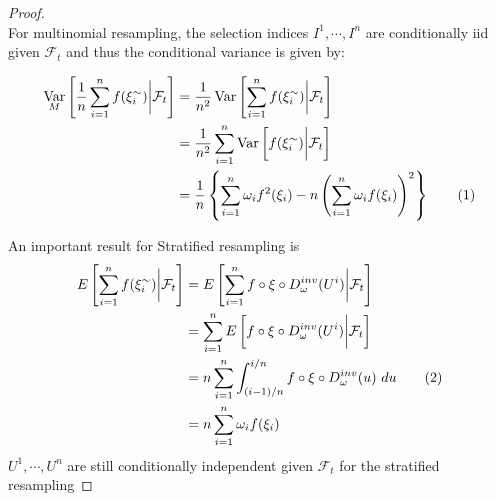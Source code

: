 \documentclass[11pt,a4,twosided,singlespacing,titlepagenumber=on]{scrreprt}
\numberwithin{equation}{chapter} %
\theoremstyle{remark}
\DeclareMathOperator{\var}{Var}
\newcommand\numberthis{\addtocounter{equation}{1}\tag{\theequation}}
\begin{document}
\begin{proof}
\cite{douc2005} \\
For multinomial resampling, the selection indices $I^1,\cdots,I^n$ are conditionally iid given $\mathcal{F}_t$ and thus the conditional variance is given by:

\begin{align*}
\var_M \left[ \frac{1}{n} \sum_{i=1}^n f(\xi_i^\sim) \bigg| \mathcal{F}_t \right] &= \frac{1}{n^2} \var \left[ \sum_{i=1}^n f(\xi_i^\sim) \bigg| \mathcal{F}_t \right] \\
																					  &= \frac{1}{n^2} \sum_{i=1}^n \var \left[ f(\xi_i^\sim) \bigg| \mathcal{F}_t \right] \\
																					  &= \frac{1}{n} \left\{\sum_{i=1}^n \omega_i f^2(\xi_i) - n \left(\sum_{i=1}^n \omega_i f(\xi_i)\right)^2\right\} \numberthis
\end{align*}

An important result for Stratified resampling is
\begin{align*}
E \left[ \sum_{i=1}^n f(\xi_i^\sim)  \bigg| \mathcal{F}_t \right] &= E \left[ \sum_{i=1}^n f \circ \xi \circ D_\omega^{inv}(U^i) \bigg| \mathcal{F}_t \right] \\
																  &= \sum_{i=1}^n E \left[ f \circ \xi \circ D_\omega^{inv}(U^i) \bigg| \mathcal{F}_t \right] \\
																  &= n \sum_{i=1}^n \int_{(i-1)/n}^{i/n} f \circ \xi \circ D_\omega^{inv}(u)\text{ }du \numberthis \\
																  &= n \sum_{i=1}^n \omega_i f(\xi_i)
\end{align*}
$U^1,\cdots,U^n$ are still conditionally independent given $\mathcal{F}_t$ for the stratified resampling



\end{proof}
\end{document}

